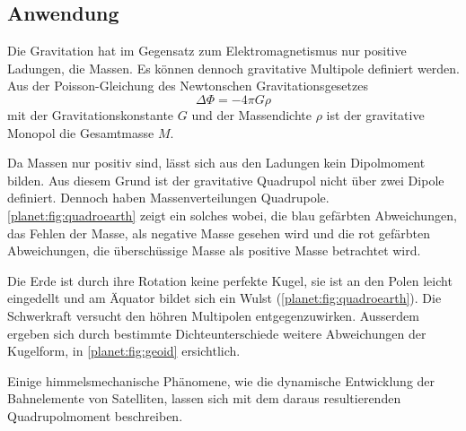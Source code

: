 \subsection{Anwendung
\label{planet:subsection:anwendung}}
Die Gravitation hat im Gegensatz zum Elektromagnetismus nur positive Ladungen, die Massen.
%
Es können dennoch gravitative Multipole definiert werden.
Aus der Poisson-Gleichung des Newtonschen Gravitationsgesetzes
\begin{equation*}
    \Delta \Phi = -4\pi G\rho
\end{equation*}
mit der Gravitationskonstante \(G\) und der Massendichte \(\rho\) ist der gravitative Monopol die Gesamtmasse \(M\).

Da Massen nur positiv sind, lässt sich aus den Ladungen kein Dipolmoment bilden.
%
Aus diesem Grund ist der gravitative Quadrupol nicht über zwei Dipole definiert.
%
Dennoch haben Massenverteilungen Quadrupole.
\cref{planet:fig:quadroearth} zeigt ein solches wobei, die blau gefärbten Abweichungen, das Fehlen der Masse, als negative Masse gesehen wird und die rot gefärbten Abweichungen, die überschüssige Masse als positive Masse betrachtet wird.  
\begin{beispiel}
    Die Erde ist durch ihre Rotation keine perfekte Kugel, sie ist an den Polen leicht eingedellt und am Äquator bildet sich ein Wulst (\cref{planet:fig:quadroearth}).
    Die Schwerkraft versucht den höhren Multipolen entgegenzuwirken.
    Ausserdem ergeben sich durch bestimmte Dichteunterschiede weitere Abweichungen der Kugelform, in \cref{planet:fig:geoid} ersichtlich.
\end{beispiel}

Einige himmelsmechanische Phänomene, wie die dynamische Entwicklung der Bahnelemente von Satelliten, lassen sich mit dem daraus resultierenden Quadrupolmoment beschreiben.

